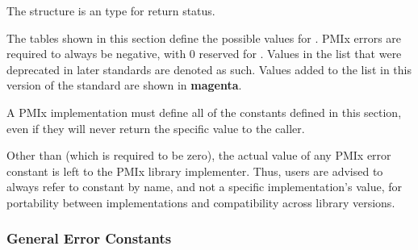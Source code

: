 The  structure is an  type for return status.

The tables shown in this section define the possible values for .
PMIx errors are required to always be negative, with 0 reserved for . Values in the list that were deprecated in later standards are denoted as such. Values added to the list in this version of the standard are shown in \textbf{\color{magenta}magenta}.

\adviceimplstart
A PMIx implementation must define all of the constants defined in this section, even if they will never return the specific value to the caller.
\adviceimplend

\adviceuserstart
Other than  (which is required to be zero), the actual value of any \ac{PMIx} error constant is left to the \ac{PMIx} library implementer. Thus, users are advised to always refer to constant by name, and not a specific implementation's value, for portability between implementations and compatibility across library versions.
\adviceuserend

\subsubsection{General Error Constants}

